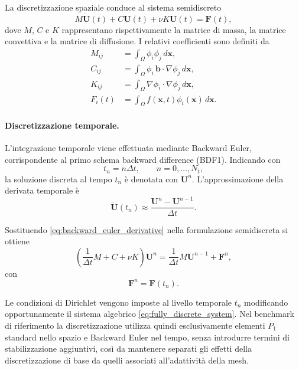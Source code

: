 La discretizzazione spaziale conduce al sistema semidiscreto
\begin{equation}
M\dot{\mathbf{U}}(t)
+
C\mathbf{U}(t)
+
\nu K\mathbf{U}(t)
=
\mathbf{F}(t),
\label{eq:semidiscrete_system}
\end{equation}
dove $M$, $C$ e $K$ rappresentano rispettivamente la matrice di massa, la matrice convettiva e la matrice di diffusione. I relativi coefficienti sono definiti da
\begin{align}
M_{ij}
&=
\int_{\Omega}\phi_i\phi_j\,d\mathbf{x},
\label{eq:mass_matrix}
\\
C_{ij}
&=
\int_{\Omega}
\phi_i\,
\mathbf{b}\cdot\nabla\phi_j
\,d\mathbf{x},
\label{eq:convection_matrix}
\\
K_{ij}
&=
\int_{\Omega}
\nabla\phi_i\cdot\nabla\phi_j
\,d\mathbf{x},
\label{eq:stiffness_matrix}
\\
F_i(t)
&=
\int_{\Omega}f(\mathbf{x},t)\phi_i(\mathbf{x})\,d\mathbf{x}.
\label{eq:load_vector}
\end{align}

\paragraph{Discretizzazione temporale.}

L'integrazione temporale viene effettuata mediante Backward Euler, corrispondente al primo schema backward difference (BDF1). Indicando con
\[
t_n=n\Delta t,
\qquad
n=0,\ldots,N_t,
\]
la soluzione discreta al tempo $t_n$ è denotata con $\mathbf{U}^n$. L'approssimazione della derivata temporale è
\begin{equation}
\dot{\mathbf{U}}(t_n)
\approx
\frac{\mathbf{U}^n-\mathbf{U}^{n-1}}{\Delta t}.
\label{eq:backward_euler_derivative}
\end{equation}

Sostituendo \eqref{eq:backward_euler_derivative} nella formulazione semidiscreta si ottiene
\begin{equation}
\left(
\frac{1}{\Delta t}M+C+\nu K
\right)
\mathbf{U}^n
=
\frac{1}{\Delta t}M\mathbf{U}^{n-1}
+
\mathbf{F}^n,
\label{eq:fully_discrete_system}
\end{equation}
con
\[
\mathbf{F}^n=\mathbf{F}(t_n).
\]

Le condizioni di Dirichlet vengono imposte al livello temporale $t_n$ modificando opportunamente il sistema algebrico \eqref{eq:fully_discrete_system}. Nel benchmark di riferimento la discretizzazione utilizza quindi esclusivamente elementi $P_1$ standard nello spazio e Backward Euler nel tempo, senza introdurre termini di stabilizzazione aggiuntivi, così da mantenere separati gli effetti della discretizzazione di base da quelli associati all'adattività della mesh.

